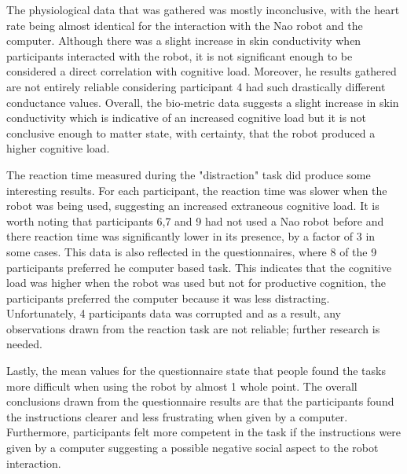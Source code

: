 \documentclass[conference]{IEEEtran}
\begin{document}

The physiological data that was gathered was mostly inconclusive, with the heart rate being almost identical for the interaction with the Nao robot and the computer. Although there was a slight increase in skin conductivity when participants interacted with the robot, it is not significant enough to be considered a direct correlation with cognitive load. Moreover, he results gathered are not entirely reliable considering participant 4 had such drastically different conductance values. Overall, the bio-metric data suggests a slight increase in skin conductivity which is indicative of an increased cognitive load but it is not conclusive enough to matter state, with certainty, that the robot produced a higher cognitive load.\newline

The reaction time measured during the "distraction" task did produce some interesting results. For each participant, the reaction time was slower when the robot was being used, suggesting an increased extraneous cognitive load. It is worth noting that participants 6,7 and 9 had not used a Nao robot before and there reaction time was significantly lower in its presence, by a factor of 3 in some cases. This data is also reflected in the questionnaires, where 8 of the 9 participants preferred he computer based task. This indicates that the cognitive load was higher when the robot was used but not for productive cognition, the participants preferred the computer because it was less distracting. Unfortunately, 4 participants data was corrupted and as a result, any observations drawn from the reaction task are not reliable; further research is needed. \newline

Lastly, the mean values for the questionnaire state that people found the tasks more difficult when using the robot by almost 1 whole point. The overall conclusions drawn from the questionnaire results are that the participants found the instructions clearer and less frustrating when given by a computer. Furthermore, participants felt more competent in the task if the instructions were given by a computer suggesting a possible negative social aspect to the robot interaction.\newline
\end{document}
